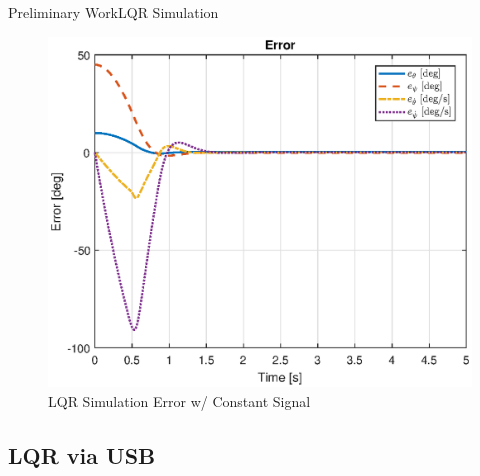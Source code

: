 \documentclass{beamer}
\begin{document}
\begin{frame}{Preliminary Work}{LQR Simulation}
    \begin{figure}
      \centering 
      \includegraphics[scale=0.5]{figs/MATLAB/LQR/simulation/LQR_Error_Con}
      \caption{LQR Simulation Error w/ Constant Signal}
      \label{fig:LQR_Error_Con}
    \end{figure}
\end{frame}



\subsection{LQR via USB} %


\end{document}
